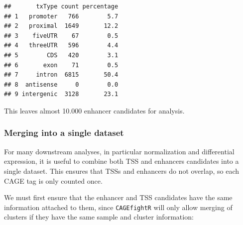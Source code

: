 \documentclass[9pt,a4paper,]{extarticle}
\newenvironment{Shaded}{\begin{snugshade}}{\end{snugshade}}
\newcommand{\KeywordTok}[1]{\textcolor[rgb]{0.13,0.29,0.53}{\textbf{{#1}}}}
\newcommand{\StringTok}[1]{\textcolor[rgb]{0.31,0.60,0.02}{{#1}}}
\newcommand{\CommentTok}[1]{\textcolor[rgb]{0.56,0.35,0.01}{\textit{{#1}}}}
\newcommand{\OtherTok}[1]{\textcolor[rgb]{0.56,0.35,0.01}{{#1}}}
\newcommand{\NormalTok}[1]{{#1}}
\begin{document}
\begin{verbatim}
##       txType count percentage
## 1   promoter   766        5.7
## 2   proximal  1649       12.2
## 3    fiveUTR    67        0.5
## 4   threeUTR   596        4.4
## 5        CDS   420        3.1
## 6       exon    71        0.5
## 7     intron  6815       50.4
## 8  antisense     0        0.0
## 9 intergenic  3128       23.1
\end{verbatim}

\begin{Shaded}
\end{Shaded}

This leaves almost 10.000 enhancer candidates for analysis.

\subsubsection{Merging into a single dataset}\label{merging-into-a-single-dataset}

For many downstream analyses, in particular normalization and differential expression, it is useful to combine both TSS and enhancers candidates into a single dataset. This ensures that TSSs and enhancers do not overlap, so each CAGE tag is only counted once.

We must first ensure that the enhancer and TSS candidates have the same information attached to them, since \texttt{CAGEfightR} will only allow merging of clusters if they have the same sample and cluster information:

\begin{Shaded}
\end{Shaded}
\end{document}
